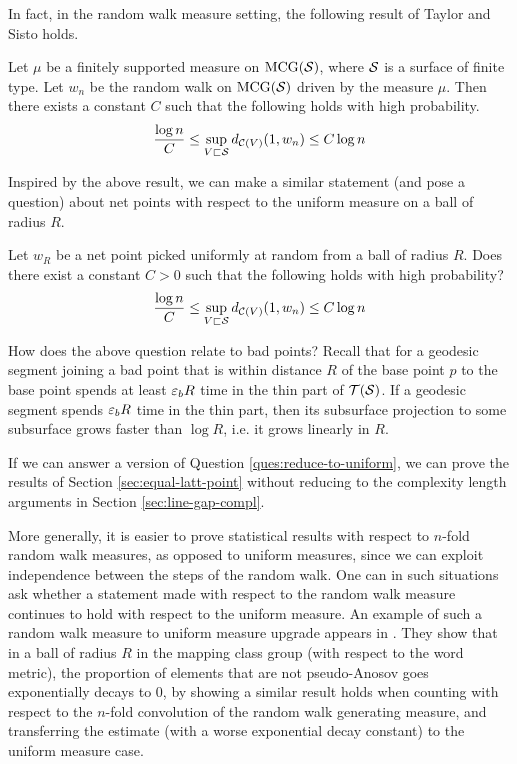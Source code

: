 In fact, in the random walk measure setting, the following result of Taylor and Sisto holds.
\begin{theorem}
  Let $\mu$ be a finitely supported measure on $\mathrm{MCG}(\mathcal{S})$, where $\mathcal{S}$ is a surface of finite type.
  Let $w_n$ be the random walk on $\mathrm{MCG}(\mathcal{S})$ driven by the measure $\mu$.
  Then there exists a constant $C$ such that the following holds with high probability.
  \begin{align*}
    \frac{\log n}{C} \leq \sup_{V \sqsubset \mathcal{S}} d_{\mathcal{C}(V)}(1, w_n) \leq C \log n
  \end{align*}
\end{theorem}

Inspired by the above result, we can make a similar statement (and pose a question) about net points with respect to the uniform measure on a ball of radius $R$.
\begin{question}
  \label{ques:reduce-to-uniform}
  Let $w_R$ be a net point picked uniformly at random from a ball of radius $R$.
  Does there exist a constant $C > 0$ such that the following holds with high probability?
  \begin{align}
    \label{ques:log-bound}
    \frac{\log n}{C} \leq \sup_{V \sqsubset \mathcal{S}} d_{\mathcal{C}(V)}(1, w_n) \leq C \log n
  \end{align}
\end{question}

How does the above question relate to bad points?
Recall that for a geodesic segment joining a bad point that is within distance $R$ of the base point $p$ to the base point spends at least $\varepsilon_b R$ time in the thin part of $\mathcal{T}(\mathcal{S})$.
If a geodesic segment spends $\varepsilon_b R$ time in the thin part, then its subsurface projection to some subsurface grows faster than $\log R$, i.e. it grows linearly in $R$.

If we can answer a version of Question \ref{ques:reduce-to-uniform}, we can prove the results of Section \ref{sec:equal-latt-point} without reducing to the complexity length arguments in Section \ref{sec:line-gap-compl}.

More generally, it is easier to prove statistical results with respect to $n$-fold random walk measures, as opposed to uniform measures, since we can exploit independence between the steps of the random walk.
One can in such situations ask whether a statement made with respect to the random walk measure continues to hold with respect to the uniform measure.
An example of such a random walk measure to uniform measure upgrade appears in \textcite{choi2022pseudoanosovs}.
They show that in a ball of radius $R$ in the mapping class group (with respect to the word metric), the proportion of elements that are not pseudo-Anosov goes exponentially decays to $0$, by showing a similar result holds when counting with respect to the $n$-fold convolution of the random walk generating measure, and transferring the estimate (with a worse exponential decay constant) to the uniform measure case.

